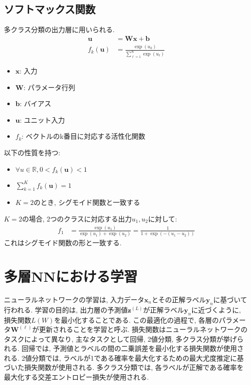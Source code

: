 \documentclass[dvipdfmx, 10pt]{jsarticle}
\begin{document}
\begin{oframed}
\subsection*{ソフトマックス関数}
多クラス分類の出力層に用いられる. 
\begin{align*}
    \mathbf{u} &= \mathbf{W} \mathbf{x} + \mathbf{b} \\
    f_k(\mathbf{u}) &= \frac{\exp(u_k)}{\sum^{K}_{\ell=1} \exp(u_{\ell})}
\end{align*}
\begin{itemize}
    \item $\mathbf{x}$: 入力
    \item $\mathbf{W}$: パラメータ行列
    \item $\mathbf{b}$: バイアス
    \item $\mathbf{u}$: ユニット入力
    \item $f_k$: ベクトルのk番目に対応する活性化関数
\end{itemize}

以下の性質を持つ: 
\begin{itemize}
    \item $\forall u \in \mathbb{R}, 0 < f_k(\mathbf{u}) < 1$
    \item $\sum^{K}_{k=1} f_k(\mathbf{u}) = 1$
    \item $K=2$のとき, シグモイド関数と一致する
\end{itemize}

$K = 2$の場合, 2つのクラスに対応する出力$u_1, u_2$に対して: 
\begin{align*}
    f_1 &= \frac{\exp(u_1)}{\exp(u_1) + \exp(u_2)} = \frac{1}{1 + \exp(-(u_1 - u_2))}
\end{align*}
これはシグモイド関数の形と一致する. 

\end{oframed}

\section*{多層NNにおける学習}
ニューラルネットワークの学習は, 入力データ\(\mathbf{x}_n\)とその正解ラベル\(\mathbf{y}_n\)に基づいて行われる. 
学習の目的は, 出力層の予測値\(\mathbf{z}^{(L)}\)が正解ラベル\(\mathbf{y}_n\)に近づくように, 損失関数\(L(W)\)を最小化することである. 
この最適化の過程で, 各層のパラメータ\(\mathbf{W}^{(\ell)}\)が更新されることを学習と呼ぶ. 
損失関数はニューラルネットワークのタスクによって異なり, 主なタスクとして回帰, 2値分類, 多クラス分類が挙げられる. 
回帰では, 予測値とラベルの間の二乗誤差を最小化する損失関数が使用される. 
2値分類では, ラベルが1である確率を最大化するための最大尤度推定に基づいた損失関数が使用される. 
多クラス分類では, 各ラベルが正解である確率を最大化する交差エントロピー損失が使用される. 
\end{document}
